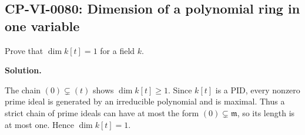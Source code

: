 
\subsection*{CP-VI-0080: Dimension of a polynomial ring in one variable}

Prove that $\dim k[t]=1$ for a field $k$.

\medskip
\noindent\textbf{Solution.}

The chain $(0)\subsetneq(t)$ shows $\dim k[t]\ge1$. Since $k[t]$ is a PID, every nonzero prime ideal is generated by an irreducible polynomial and is maximal. Thus a strict chain of prime ideals can have at most the form $(0)\subsetneq\mathfrak m$, so its length is at most one. Hence $\dim k[t]=1$.
